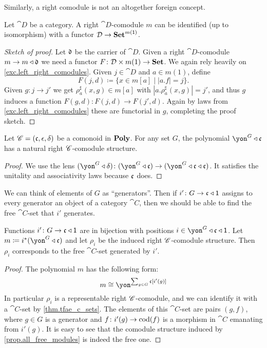 \documentclass[Book-Poly]{subfiles}
\begin{document}
Similarly, a right comodule is not an altogether foreign concept.

\begin{proposition} \label{prop.right_comod}
Let $\cat{D}$ be a category.
A right $\cat{D}$-comodule $m$ can be identified (up to isomorphism) with a functor $\mathcal{D}\to\mathbf{Set}^{m(\textsf{1})}$.
\end{proposition}
\begin{proof}[Sketch of proof]
Let $\mathfrak{d}$ be the carrier of $\cat{D}$. Given a right $\cat{D}$-comodule $m\to m\mathbin{\triangleleft}\mathfrak{d}$ we need a functor $F\colon\mathcal{D}\times m(1)\to\mathbf{Set}$. We again rely heavily on \cref{exc.left_right_comodules}.
Given $j\in\cat{D}$ and $a\in m(1)$, define
\[F(j,d)\coloneqq\{x\in m[a]\mid|a.f|=j\}.\]
Given $g\colon j\to j'$ we get $\rho_a^\sharp(x,g)\in m[a]$ with $|a.\rho_a^\sharp(x,g)|=j'$, and thus $g$ induces a function $F(g,d)\colon F(j,d)\to F(j',d)$. Again by laws from \cref{exc.left_right_comodules} these are functorial in $g$, completing the proof sketch.
\end{proof}


\begin{proposition}\label{prop.all_free_modules}
Let $\mathscr{C}=(\mathfrak{c},\epsilon,\delta)$ be a comonoid in $\mathbf{Poly}$. For any set $G$, the polynomial $\yon^G\tri\car{c}$ has a natural right $\mathscr{C}$-comodule structure.
\end{proposition}
\begin{proof}
We use the lens $(\yon^G\tri\delta)\colon(\yon^G\tri\car{c})\to(\yon^G\tri\car{c}\tri\car{c})$. It satisfies the unitality and associativity laws because $\mathfrak{c}$ does.
\end{proof}

We can think of elements of $G$ as ``generators''. Then if $i'\colon G\to\mathfrak{c}\mathbin{\triangleleft}\textsf{1}$ assigns to every generator an object of a category $\cat{C}$, then we should be able to find the free $\cat{C}$-set that $i'$ generates.

\begin{proposition}
Functions $i'\colon G\to\mathfrak{c}\mathbin{\triangleleft}\textsf{1}$ are in bijection with positions $i\in\yon^G\tri\car{c}\tri\1$. Let $m\coloneqq i^*(\yon^G\tri\car{c})$ and let $\rho_i$ be the induced right $\mathscr{C}$-comodule structure. %
Then $\rho_i$ corresponds to the free $\cat{C}$-set generated by $i'$.
\end{proposition}
\begin{proof}
The polynomial $m$ has the following form:
\[
m\cong\yon^{\sum_{g\in G}\car{c}[i'(g)]}
\]
In particular $\rho_i$ is a representable right $\mathscr{C}$-comodule, and we can identify it with a $\cat{C}$-set by \cref{thm.tfae_c_sets}. The elements of this $\cat{C}$-set are pairs $(g, f)$, where $g\in G$ is a generator and $f\colon i'(g)\to\operatorname{cod}(f)$ is a morphism in $\cat{C}$ emanating from $i'(g)$. It is easy to see that the comodule structure induced by \cref{prop.all_free_modules} is indeed the free one.
\end{proof}
\end{document}
